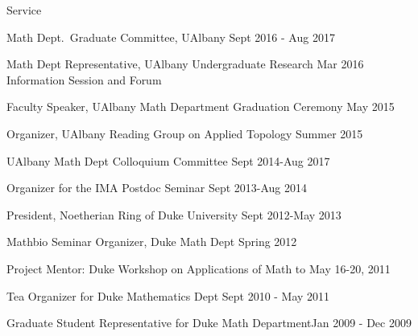 \documentclass{resume} %
\begin{document}
\begin{rSection}{Service}
\begin{list}{}{\leftmargin=1em}
\item
Math Dept.~Graduate Committee, UAlbany \hfill Sept 2016 - Aug 2017
\item
Math Dept Representative, UAlbany Undergraduate Research  \hfill Mar 2016\\
\phantom{MMM}Information Session and Forum
\item
Faculty Speaker, UAlbany Math Department Graduation Ceremony \hfill May 2015
\item
{Organizer, UAlbany Reading Group on Applied Topology } \hfill Summer 2015
\item
{UAlbany Math Dept Colloquium Committee} \hfill Sept 2014-Aug 2017
\item
{Organizer for the IMA Postdoc Seminar} \hfill Sept 2013-Aug 2014
\item
{President, Noetherian Ring of Duke University} \hfill Sept 2012-May 2013
\item
{Mathbio Seminar Organizer, Duke Math Dept} \hfill Spring 2012
\item
{Project Mentor: Duke Workshop on Applications of Math to}
\hfill May 16-20, 2011\\
\phantom{MMM}{Physiology and Medicine}

\item
{Tea Organizer for Duke Mathematics Dept} \hfill Sept 2010 - May 2011
\item
{Graduate Student Representative for Duke Math Department}\hfill Jan 2009 - Dec 2009
\end{list}


\end{rSection}
\end{document}

